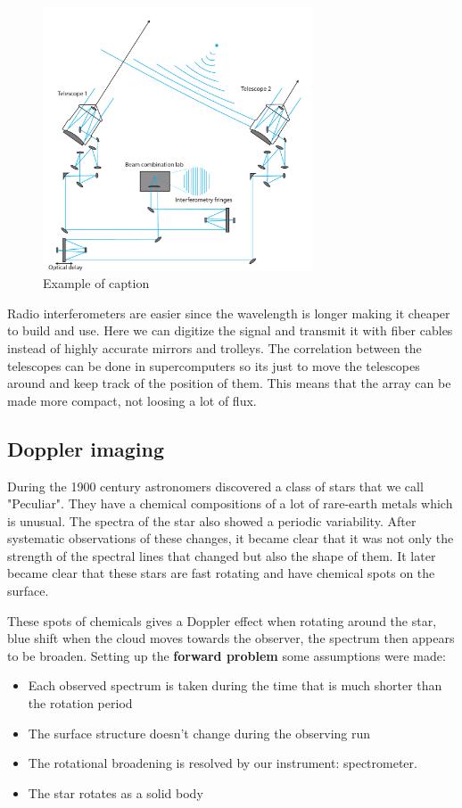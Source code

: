 		\begin{figure}[ht!]
		 \centering
		 \includegraphics[width=80mm]{figures/telescopes.pdf}
		 \caption{Example of caption}
		 \label{fig:example}
		 \end{figure}
	  
	 Radio interferometers are easier since the wavelength is longer making it cheaper to build and use. Here we can digitize the signal and transmit it with fiber cables instead of highly accurate mirrors and trolleys. The correlation between the telescopes can be done in supercomputers so its just to move the telescopes around and keep track of the position of them. This means that the array can be made more compact, not loosing a lot of flux. 

	 \subsection{Doppler imaging}
	 During the 1900 century astronomers discovered a class of stars that we call "Peculiar". They have a chemical compositions of a lot of rare-earth metals which is unusual. The spectra of the star also showed a periodic variability. After systematic observations of these changes, it became clear that it was not only the strength of the spectral lines that changed but also the shape of them. It later became clear that these stars are fast rotating and have chemical spots on the surface. 

	 These spots of chemicals gives a Doppler effect when rotating around the star, blue shift when the cloud moves towards the observer, the spectrum then appears to be broaden. Setting up the \textbf{forward problem} some assumptions were made: 

		\begin{itemize}
			\item Each observed spectrum is taken during the time that is much shorter than the rotation period
		   	\item The surface structure doesn't change during the observing run
		   	\item The rotational broadening is resolved by our instrument: spectrometer. 
		   	\item The star rotates as a solid body
		\end{itemize}  

